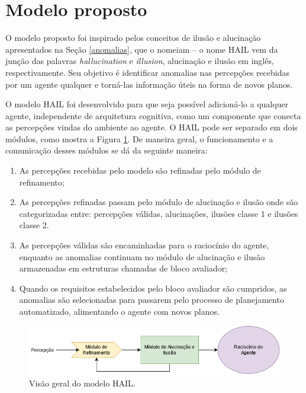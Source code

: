 \section{Modelo proposto}

O modelo proposto foi inspirado pelos conceitos de ilusão e alucinação apresentados na Seção \ref{anomalias}, que o nomeiam -- o nome HAIL vem da junção das palavras \textit{hallucination} e \textit{illusion}, alucinação e ilusão em inglês, respectivamente. Seu objetivo é identificar anomalias nas percepções recebidas por um agente qualquer e torná-las informação úteis na forma de novos planos.

O modelo HAIL foi desenvolvido para que seja possível adicioná-lo a qualquer agente, independente de arquitetura cognitiva, como um componente que conecta as percepções vindas do ambiente ao agente. O HAIL pode ser separado em dois módulos, como mostra a Figura \ref{fig:method}. De maneira geral, o funcionamento e a comunicação desses módulos se dá da seguinte maneira:

\begin{enumerate}
    \item As percepções recebidas pelo modelo são refinadas pelo módulo de refinamento;
    \item As percepções refinadas passam pelo módulo de alucinação e ilusão onde são categorizadas entre:  percepções válidas, alucinações, ilusões classe 1 e ilusões classe 2. 
    \item As percepções válidas são encaminhadas para o raciocínio do agente, enquanto as anomalias continuam no módulo de alucinação e ilusão armazenadas em estruturas chamadas de bloco avaliador;
    \item Quando os requisitos estabelecidos pelo bloco avaliador são cumpridos, as anomalias são selecionadas para passarem pelo processo de planejamento automatizado, alimentando o agente com novos planos.
\end{enumerate}
    
\begin{figure}[h!]
    \centering
    \includegraphics[width=1\textwidth]{images/modelo_geral.png}
    \caption{Visão geral do modelo HAIL.}
    \label{fig:method}
\end{figure}

